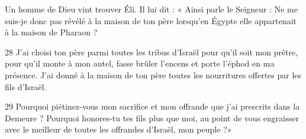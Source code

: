 Un homme de Dieu vint trouver Éli. Il lui dit : « Ainsi parle le Seigneur : Ne me suis-je donc pas révélé à la maison de ton père lorsqu’en Égypte elle appartenait à la maison de Pharaon ?

28 J’ai choisi ton père parmi toutes les tribus d’Israël pour qu’il soit mon prêtre, pour qu’il monte à mon autel, fasse brûler l’encens et porte l’éphod en ma présence. J’ai donné à la maison de ton père toutes les nourritures offertes par les fils d’Israël.

29 Pourquoi piétinez-vous mon sacrifice et mon offrande que j’ai prescrits dans la Demeure ? Pourquoi honores-tu tes fils plus que moi, au point de vous engraisser avec le meilleur de toutes les offrandes d’Israël, mon peuple ?»
